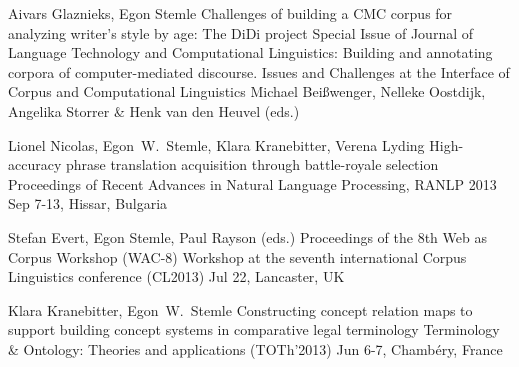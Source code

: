 \documentclass[11pt,a4paper]{moderncv}
\begin{document}
        {Aivars Glaznieks, Egon Stemle}
        {\small Challenges of building a CMC corpus for analyzing writer's
        style by age: The DiDi project} 
        {\small Special Issue of Journal of Language Technology and
        Computational Linguistics: Building and annotating corpora of
        computer-mediated discourse. Issues and Challenges at the Interface of
        Corpus and Computational Linguistics}
        {\small Michael Beißwenger, Nelleke Oostdijk, Angelika Storrer \& Henk van den Heuvel (eds.)}
        {}

        {Lionel Nicolas, Egon~W.~Stemle, Klara Kranebitter, Verena Lyding}
        {\small High-accuracy phrase translation acquisition through
        battle-royale selection}
        {\small Proceedings of Recent Advances in Natural Language Processing,
        RANLP 2013}
        {\small Sep 7-13, Hissar, Bulgaria}
        {}


        {Stefan Evert, Egon Stemle, Paul Rayson (eds.)}
        {\small Proceedings of the 8th Web as Corpus Workshop (WAC-8)}
        {\small Workshop at the seventh international Corpus Linguistics conference (CL2013)}
        {\small Jul 22, Lancaster, UK}
        {}



        {Klara Kranebitter, Egon~W.~Stemle}
        {\small Constructing concept relation maps to support building concept
        systems in comparative legal terminology}
        {\small Terminology \& Ontology: Theories and applications (TOTh'2013)}
        {\small Jun 6-7, Chamb\'{e}ry, France}
        {}
\end{document}
